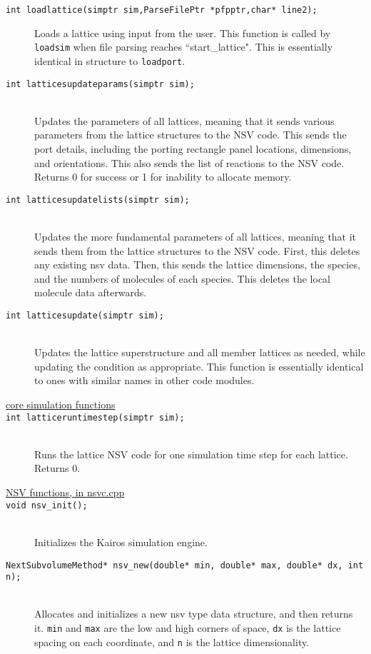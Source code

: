 \documentclass {book}
\begin{document}
\begin{description}
\item[\texttt{int loadlattice(simptr sim,ParseFilePtr *pfpptr,char* line2);}]
Loads a lattice using input from the user.  This function is called by \texttt{loadsim} when file parsing reaches ``start\_lattice".  This is essentially identical in structure to \texttt{loadport}.

\item[\texttt{int latticesupdateparams(simptr sim);}]
\hfill \\
Updates the parameters of all lattices, meaning that it sends various parameters from the lattice structures to the NSV code.  This sends the port details, including the porting rectangle panel locations, dimensions, and orientations.  This also sends the list of reactions to the NSV code.  Returns 0 for success or 1 for inability to allocate memory.

\item[\texttt{int latticesupdatelists(simptr sim);}]
\hfill \\
Updates the more fundamental parameters of all lattices, meaning that it sends them from the lattice structures to the NSV code.  First, this deletes any existing nsv data.  Then, this sends the lattice dimensions, the species, and the numbers of molecules of each species.  This deletes the local molecule data afterwards.

\item[\texttt{int latticesupdate(simptr sim);}]
\hfill \\
Updates the lattice superstructure and all member lattices as needed, while updating the condition as appropriate.  This function is essentially identical to ones with similar names in other code modules.

\item[\underline{core simulation functions}]

\item[\texttt{int latticeruntimestep(simptr sim);}]
\hfill \\
Runs the lattice NSV code for one simulation time step for each lattice.  Returns 0.

\item[\underline{NSV functions, in nsvc.cpp}]

\item[\texttt{void nsv\_init();}]
\hfill \\
Initializes the Kairos simulation engine.

\item[\texttt{NextSubvolumeMethod* nsv\_new(double* min, double* max, double* dx, int n);}]
\hfill \\
Allocates and initializes a new nsv type data structure, and then returns it. \texttt{min} and \texttt{max} are the low and high corners of space, \texttt{dx} is the lattice spacing on each coordinate, and \texttt{n} is the lattice dimensionality.


\end{description}
\end{document}
